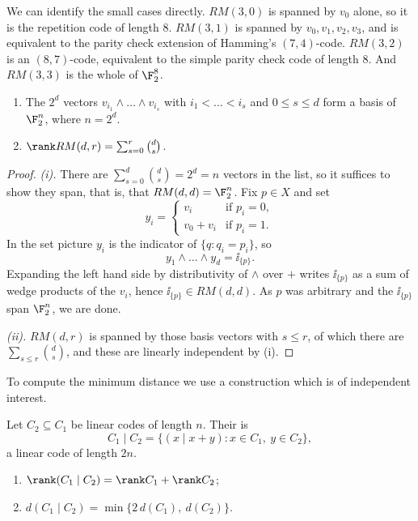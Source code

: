 We can identify the small cases directly. $RM(3,0)$ is spanned by $v_0$ alone, so it is the repetition code of length $8$. $RM(3,1)$ is spanned by $v_0,v_1,v_2,v_3$, and is equivalent to the parity check extension of Hamming's $(7,4)$-code. $RM(3,2)$ is an $(8,7)$-code, equivalent to the simple parity check code of length $8$. And $RM(3,3)$ is the whole of $\F_2^8$.

\begin{theorem}\label{thm:rmrank}
	\begin{enumerate}[label=(\roman*)]
		\item The $2^d$ vectors $v_{i_1}\wedge\dots\wedge v_{i_s}$ with $i_1<\dots<i_s$ and $0 \le s \le d$ form a basis of $\F_2^n$, where $n = 2^d$.
		\item $\rank RM(d,r) = \sum_{s=0}^r \binom ds$.
	\end{enumerate}
\end{theorem}

\begin{proof}
	\emph{(i).} There are $\sum_{s=0}^d\binom ds = 2^d = n$ vectors in the list, so it suffices to show they span, that is, that $RM(d,d) = \F_2^n$. Fix $p \in X$ and set
	$$y_i = \begin{cases} v_i & \text{if } p_i = 0,\\ v_0+v_i & \text{if } p_i = 1.\end{cases}$$
	In the set picture $y_i$ is the indicator of $\{q : q_i = p_i\}$, so
	$$y_1 \wedge \dots \wedge y_d = \ii_{\{p\}}.$$
	Expanding the left hand side by distributivity of $\wedge$ over $+$ writes $\ii_{\{p\}}$ as a sum of wedge products of the $v_i$, hence $\ii_{\{p\}} \in RM(d,d)$. As $p$ was arbitrary and the $\ii_{\{p\}}$ span $\F_2^n$, we are done.

	\emph{(ii).} $RM(d,r)$ is spanned by those basis vectors with $s \le r$, of which there are $\sum_{s\le r}\binom ds$, and these are linearly independent by (i).
\end{proof}

To compute the minimum distance we use a construction which is of independent interest.

\begin{definition}
	Let $C_2 \subseteq C_1$ be linear codes of length $n$. Their  is
	$$C_1 \mid C_2 = \{(x \mid x+y) : x \in C_1,\ y \in C_2\},$$
	a linear code of length $2n$.
\end{definition}

\begin{lemma}\label{lem:barprod}
	\begin{enumerate}[label=(\roman*)]
		\item $\rank(C_1\mid C_2) = \rank C_1 + \rank C_2$;
		\item $d(C_1\mid C_2) = \min\{2\,d(C_1),\ d(C_2)\}$.
	\end{enumerate}
\end{lemma}

